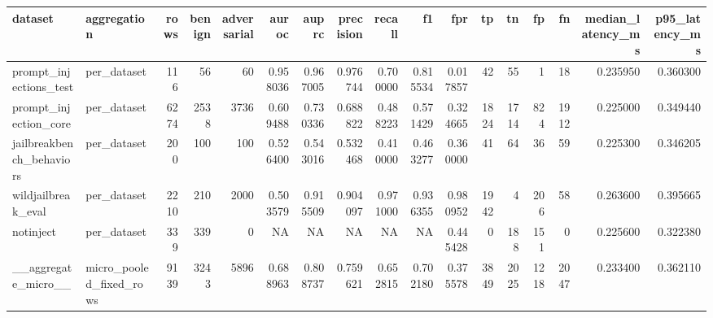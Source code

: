 \begin{tabular}{llrrrrrrrrrrrrrrr}
\toprule
dataset & aggregation & rows & benign & adversarial & auroc & auprc & precision & recall & f1 & fpr & tp & tn & fp & fn & median_latency_ms & p95_latency_ms \\
\midrule
prompt_injections_test & per_dataset & 116 & 56 & 60 & 0.958036 & 0.967005 & 0.976744 & 0.700000 & 0.815534 & 0.017857 & 42 & 55 & 1 & 18 & 0.235950 & 0.360300 \\
prompt_injection_core & per_dataset & 6274 & 2538 & 3736 & 0.609488 & 0.730336 & 0.688822 & 0.488223 & 0.571429 & 0.324665 & 1824 & 1714 & 824 & 1912 & 0.225000 & 0.349440 \\
jailbreakbench_behaviors & per_dataset & 200 & 100 & 100 & 0.526400 & 0.543016 & 0.532468 & 0.410000 & 0.463277 & 0.360000 & 41 & 64 & 36 & 59 & 0.225300 & 0.346205 \\
wildjailbreak_eval & per_dataset & 2210 & 210 & 2000 & 0.503579 & 0.915509 & 0.904097 & 0.971000 & 0.936355 & 0.980952 & 1942 & 4 & 206 & 58 & 0.263600 & 0.395665 \\
notinject & per_dataset & 339 & 339 & 0 & NA & NA & NA & NA & NA & 0.445428 & 0 & 188 & 151 & 0 & 0.225600 & 0.322380 \\
__aggregate_micro__ & micro_pooled_fixed_rows & 9139 & 3243 & 5896 & 0.688963 & 0.808737 & 0.759621 & 0.652815 & 0.702180 & 0.375578 & 3849 & 2025 & 1218 & 2047 & 0.233400 & 0.362110 \\
\bottomrule
\end{tabular}
